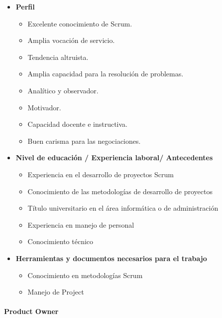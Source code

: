 \begin{itemize}
            \item \textbf{Perfil}
            	\begin{itemize}
                    \item Excelente conocimiento de Scrum.
                    \item Amplia vocación de servicio.
                    \item Tendencia altruista.
                    \item Amplia capacidad para la resolución de problemas.
                    \item Analítico y observador.
                    \item Motivador.
                    \item Capacidad docente e instructiva.
                    \item Buen carisma para las negociaciones.
				\end{itemize}   
            \item \textbf{Nivel de educación / Experiencia laboral/ Antecedentes}
                \begin{itemize}
                    \item  Experiencia en el desarrollo de proyectos Scrum
					\item Conocimiento de las metodologías de desarrollo de proyectos
					\item Título universitario en el área informática o de administración
					\item Experiencia en manejo de personal
					\item Conocimiento técnico 
                \end{itemize}
            \item \textbf{Herramientas y documentos necesarios para el trabajo}
            	\begin{itemize}
                    \item Conocimiento en metodologías Scrum
                    \item Manejo de Project
                    
                \end{itemize}   
			\end{itemize}
        
        
        \paragraph{Product Owner}
        
